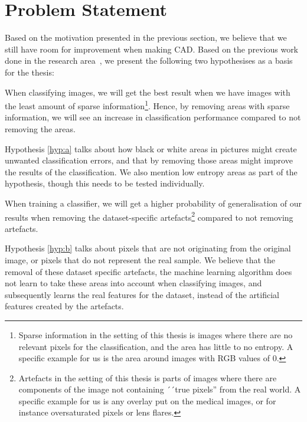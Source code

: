 \section{Problem Statement}
\label{cha:problemstatement}
Based on the motivation presented in the previous section, we believe that we still have room for improvement when making CAD. Based on the previous work done in the research area~\cite{25956,25953,riegler2016eir}, we present the following two hypothesises as a basis for the thesis:


\noindent
\begin{hyp} \label{hyp:a}
When classifying images, we will get the best result when we have images with the least amount of sparse information\footnote{Sparse information in the setting of this thesis is images where there are no relevant pixels for the classification, and the area has little to no entropy. A specific example for us is the area around images with RGB values of 0.}. 
Hence, by removing areas with sparse information,
we will see an increase in classification performance compared to not removing the areas.
\end{hyp}

\noindent
Hypothesis \ref{hyp:a} talks about how black or white areas in pictures might create unwanted classification errors, and that by removing those areas might improve the results of the classification. We also mention low entropy areas as part of the hypothesis, though this needs to be tested individually.


\noindent 
\begin{hyp} \label{hyp:b}
When training a classifier, we will get a higher probability of generalisation of our results when removing the dataset-specific artefacts\footnote{Artefacts in the setting of this thesis is parts of images where there are components of the image not containing ´´true pixels'' from the real world. A specific example for us is any overlay put on the medical images, or for instance oversaturated pixels or lens flares.} compared to not removing artefacts.
\end{hyp}

\noindent
Hypothesis \ref{hyp:b} talks about pixels that are not originating from the original image, or pixels that do not represent the real sample. We believe that the removal of these dataset specific artefacts, the machine learning algorithm does not learn to take these areas into account when classifying images, and subsequently learns the real features for the dataset, instead of the artificial features created by the artefacts.


